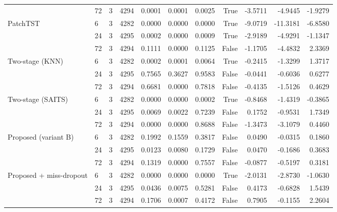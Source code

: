 \begin{table}
\begin{tabular}{llrrrrrrrrr}
 & 72 & 3 & 4294 & 0.0001 & 0.0001 & 0.0025 & True & -3.5711 & -4.9445 & -1.9279 \\
\cline{1-11}
\multirow[t]{3}{*}{PatchTST} & 6 & 3 & 4282 & 0.0000 & 0.0000 & 0.0000 & True & -9.0719 & -11.3181 & -6.8580 \\
 & 24 & 3 & 4295 & 0.0002 & 0.0000 & 0.0009 & True & -2.9189 & -4.9291 & -1.1347 \\
 & 72 & 3 & 4294 & 0.1111 & 0.0000 & 0.1125 & False & -1.1705 & -4.4832 & 2.3369 \\
\cline{1-11}
\multirow[t]{3}{*}{Two-stage (KNN)} & 6 & 3 & 4282 & 0.0002 & 0.0001 & 0.0064 & True & -0.2415 & -1.3299 & 1.3717 \\
 & 24 & 3 & 4295 & 0.7565 & 0.3627 & 0.9583 & False & -0.0441 & -0.6036 & 0.6277 \\
 & 72 & 3 & 4294 & 0.6681 & 0.0000 & 0.7818 & False & -0.4135 & -1.5126 & 0.4629 \\
\cline{1-11}
\multirow[t]{3}{*}{Two-stage (SAITS)} & 6 & 3 & 4282 & 0.0000 & 0.0000 & 0.0002 & True & -0.8468 & -1.4319 & -0.3865 \\
 & 24 & 3 & 4295 & 0.0069 & 0.0022 & 0.7239 & False & 0.1752 & -0.9531 & 1.7349 \\
 & 72 & 3 & 4294 & 0.0000 & 0.0000 & 0.8688 & False & -1.3473 & -3.1079 & 0.4460 \\
\cline{1-11}
\multirow[t]{3}{*}{Proposed (variant B)} & 6 & 3 & 4282 & 0.1992 & 0.1559 & 0.3817 & False & 0.0490 & -0.0315 & 0.1860 \\
 & 24 & 3 & 4295 & 0.0123 & 0.0080 & 0.1729 & False & 0.0470 & -0.1686 & 0.3683 \\
 & 72 & 3 & 4294 & 0.1319 & 0.0000 & 0.7557 & False & -0.0877 & -0.5197 & 0.3181 \\
\cline{1-11}
\multirow[t]{3}{*}{Proposed + miss-dropout} & 6 & 3 & 4282 & 0.0000 & 0.0000 & 0.0000 & True & -2.0131 & -2.8730 & -1.0630 \\
 & 24 & 3 & 4295 & 0.0436 & 0.0075 & 0.5281 & False & 0.4173 & -0.6828 & 1.5439 \\
 & 72 & 3 & 4294 & 0.1706 & 0.0007 & 0.4172 & False & 0.7905 & -0.1155 & 2.2604 \\
\cline{1-11}
\bottomrule
\end{tabular}
\end{table}
